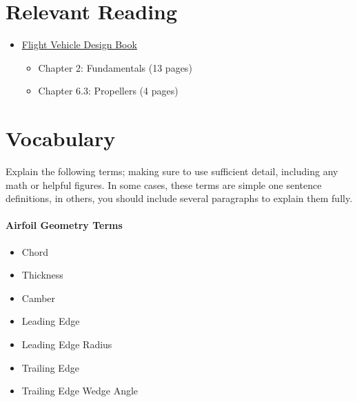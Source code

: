 \documentclass[11pt,twocolumn]{article}
\begin{document}
\section*{Relevant Reading}
\label{sec:reading}

\begin{itemize}
	\item \href{http://flowlab.groups.et.byu.net/me415/flight.pdf}{Flight Vehicle Design Book}
	\begin{itemize}
		\item Chapter 2: Fundamentals (13 pages)
		\item Chapter 6.3: Propellers (4 pages)
	\end{itemize}

\end{itemize}





\section{Vocabulary}
\label{sec:vocab}

Explain the following terms; making sure to use sufficient detail, including any math or helpful figures.
In some cases, these terms are simple one sentence definitions, in others, you should include several paragraphs to explain them fully.

\paragraph{Airfoil Geometry Terms}
\begin{itemize}
	\item Chord
	\item Thickness
	\item Camber
	\item Leading Edge
	\item Leading Edge Radius
	\item Trailing Edge
	\item Trailing Edge Wedge Angle
\end{itemize}
\end{document}
